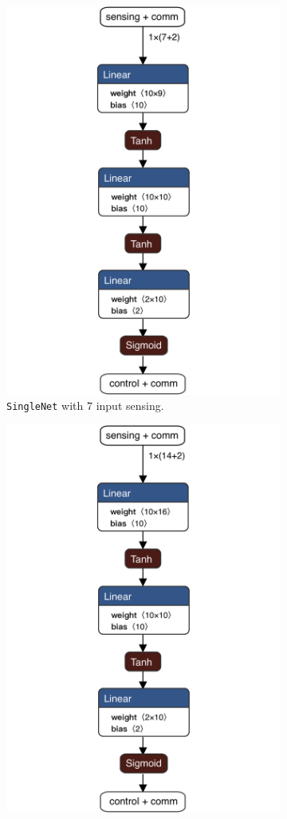 \begin{figure}[!htb]
	\centering
	\begin{subfigure}[h]{0.495\textwidth}
		\centering
		\includegraphics[width=.8\textwidth]{contents/images/task1distributedcomm@4x}%
		\caption{\texttt{SingleNet} with $7$ input sensing.}
	\end{subfigure}
	\hfill
	\begin{subfigure}[h]{0.495\textwidth}
		\centering
		\includegraphics[width=.8\textwidth]{contents/images/task1distributed_allcomm@4x}

\end{subfigure}
\end{figure}

